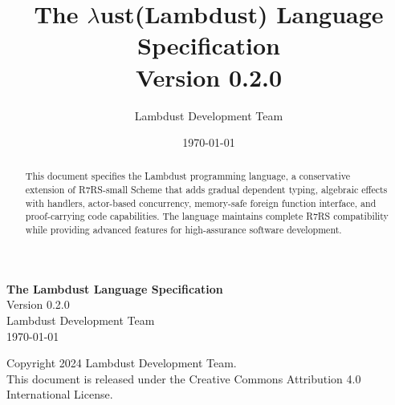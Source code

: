 \documentclass[twoside,twocolumn]{algol60}
\title{The \boldmath$\lambda$ust(Lambdust) Language Specification\\
       \large Version 0.2.0}
\author{Lambdust Development Team}
\date{\today}
\begin{document}
\parindent 0pt

\begin{center}
{\Huge\bfseries The Lambdust Language Specification}\\
\vspace{1cm}
{\Large Version 0.2.0}\\
\vspace{1cm}
{\large Lambdust Development Team}\\
\vspace{0.5cm}
{\large \today}
\end{center}

\vspace{2cm}

\begin{abstract}
\noindent This document specifies the Lambdust programming language, a conservative extension of R7RS-small Scheme that adds gradual dependent typing, algebraic effects with handlers, actor-based concurrency, memory-safe foreign function interface, and proof-carrying code capabilities. The language maintains complete R7RS compatibility while providing advanced features for high-assurance software development.
\end{abstract}

\vfill

{\small
Copyright \textcopyright{} 2024 Lambdust Development Team.\\
This document is released under the Creative Commons Attribution 4.0 International License.
}

\newpage

\tableofcontents

\newpage




















\end{document}
